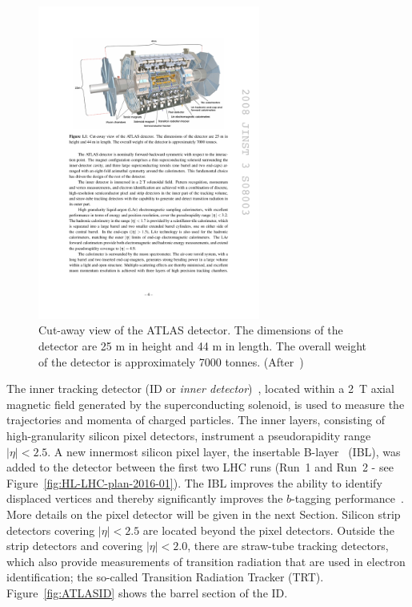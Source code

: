 \begin{figure}[!htpb]
\centering
\includegraphics[width=0.65\textwidth]{ATLASDetector.pdf}
\caption{\label{fig:ATLASDetector}Cut-away view of the ATLAS detector. The dimensions of the detector are 25 m in height and 44 m in length. The overall weight of the detector is approximately 7000 tonnes.
 (After~\cite{AtlasDetector})}
\end{figure}


The inner tracking detector (ID or {\it inner detector})~\cite{ATLASIDTDR}, located within a 2~T axial magnetic field generated by the superconducting solenoid, is used to measure the trajectories and momenta of charged particles. The inner layers, consisting of high-granularity silicon pixel detectors, instrument a pseudorapidity
range $|\eta| < 2.5$.
A new innermost silicon pixel layer, the insertable B-layer~\cite{IBLTDR} (IBL), was added to the detector between the first two LHC runs (Run~1 and Run~2 - see Figure~\ref{fig:HL-LHC-plan-2016-01}). The IBL improves the ability to identify displaced vertices and thereby significantly improves the $b$-tagging performance~\cite{ATL-PHYS-PUB-2015-022}. More details 
on the pixel detector will be given in the next Section.
Silicon strip detectors covering $|\eta| < 2.5$ are located beyond the pixel detectors. 
Outside the strip detectors and covering $|\eta | < 2.0$, there are straw-tube tracking detectors, which also provide measurements of transition radiation that are used in electron identification; the so-called 
Transition Radiation Tracker (TRT).
Figure~\ref{fig:ATLASID} shows the barrel section of the ID.

